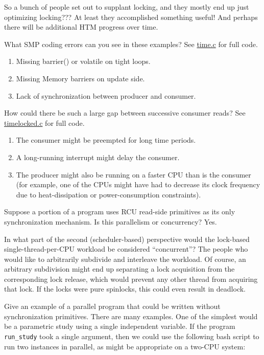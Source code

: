 \QuickQ{}
	So a bunch of people set out to supplant locking, and they
	mostly end up just optimizing locking???
\QuickA{}
	At least they accomplished something useful!
	And perhaps there will be additional HTM progress over time.

\QuickQ{}
	What SMP coding errors can you see in these examples?
	See \url{time.c} for full code.
\QuickA{}
	\begin{enumerate}
	\item	Missing barrier() or volatile on tight loops.
	\item	Missing Memory barriers on update side.
	\item	Lack of synchronization between producer and consumer.
	\end{enumerate}

\QuickQ{}
	How could there be such a large gap between successive
	consumer reads?
	See \url{timelocked.c} for full code.
\QuickA{}
	\begin{enumerate}
	\item	The consumer might be preempted for long time periods.
	\item	A long-running interrupt might delay the consumer.
	\item	The producer might also be running on a faster CPU than is the
		consumer (for example, one of the CPUs might have had to
		decrease its
		clock frequency due to heat-dissipation or power-consumption
		constraints).
	\end{enumerate}

\QuickQ{}
	Suppose a portion of a program uses RCU read-side primitives
	as its only synchronization mechanism.
	Is this parallelism or concurrency?
\QuickA{}
	Yes.

\QuickQ{}
	In what part of the second (scheduler-based) perspective would
	the lock-based single-thread-per-CPU workload be considered
	``concurrent''?
\QuickA{}
	The people who would like to arbitrarily subdivide and interleave
	the workload.
	Of course, an arbitrary subdivision might end up separating
	a lock acquisition from the corresponding lock release, which
	would prevent any other thread from acquiring that lock.
	If the locks were pure spinlocks, this could even result in
	deadlock.

\QuickQ{}
	Give an example of a parallel program that could be written
	without synchronization primitives.
\QuickA{}
	There are many examples.
	One of the simplest would be a parametric study using a
	single independent variable.
	If the program {\tt run\_study} took a single argument,
	then we could use the following bash script to run two
	instances in parallel, as might be appropriate on a
	two-CPU system:

